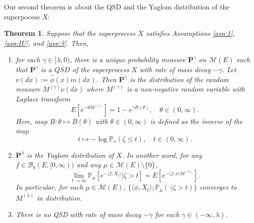 \documentclass[12pt,a4paper]{amsart}
\numberwithin{equation}{section}
\theoremstyle{plain}
\newtheorem{thm}{Theorem}[section]
\theoremstyle{definition}
\begin{document}
Our second theorem is about the QSD and the Yaglom distribution of the superpocess $X$:
\begin{thm}\label{thm:qsd_thm}
  Suppose that the superprocess $X$ satisfies Assumptions \ref{asp:1}, \ref{asp:IU}, and \ref{asp:3}.
  Then,
  \begin{enumerate}
  \item \label{thm:qsd_thm_1}
    for each $\gamma\in[\lambda,0)$, there is a unique probability measure ${\mathbf P}^{\gamma}$ on $\mathcal M(E)$ such that $ {\mathbf P}^\gamma$ is a $QSD$ of the superprocess $X$ with rate of mass decay $-\gamma$.
    Let $\nu(dx):=\widehat\phi(x) m(dx)$.
    Then ${\mathbf P}^\gamma$ is the distribution of the random measure $M^{(\gamma)}\nu(dx)$ where $M^{(\gamma)}$ is a non-negative random variable with Laplace transform
    \[
      E[e^{-\theta M^{(\gamma)}}]
      = 1 - e^{\gamma B(\theta)},
      \quad \theta \in (0,\infty).
    \]
    Here, map $B: \theta \mapsto B(\theta)$ with $\theta \in (0,\infty)$ is defined as the inverse of the map
    \[
      t
      \mapsto -\log \mathbb P_\nu(\zeta \leq t),
      \quad t\in (0,\infty).
    \]
  \item
    ${\mathbf P}^\lambda$ is the Yaglom distribution of $X$.
    In another word, for any  $f\in\mathcal B_b(E,[0,\infty))$ and any $\mu\in \mathcal M(E)\setminus\{0\}$,
    \[
      \lim_{t\rightarrow\infty}\mathbb P_{\mu}[e^{-\langle f,X_t\rangle} | \zeta>t]
      = E [e^{- \langle f,\nu\rangle M^{(\lambda)}}].
    \]
    In particular, for each $\mu \in \mathcal M(E)$, $\{\langle \phi, X_t\rangle; \mathbb P_{\mu}(\cdot| \zeta > t) \}$ converges to $M^{(\lambda)}$ in distribution.
  \item
    There is no QSD with rate of mass decay $-\gamma$ for each $\gamma\in(-\infty , \lambda)$.
  \end{enumerate}
\end{thm}
\end{document}
